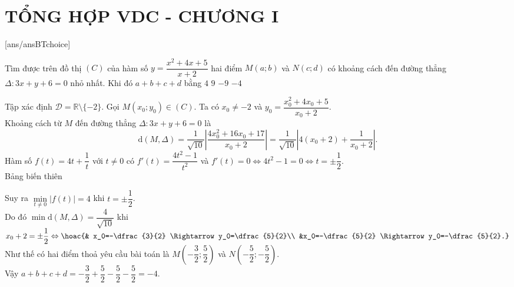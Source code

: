 \setcounter{ex}{0}
\section*{TỔNG HỢP VDC - CHƯƠNG I}
[ans/ansBTchoice]
\TN
\begin{ex}%
Tìm được trên đồ thị $(C)$ của hàm số $y=\dfrac{x^2+4x+5}{x+2}$ hai điểm $M(a;b)$ và $N(c;d)$ có khoảng cách đến đường thẳng $\Delta\colon 3x+y+6=0$ nhỏ nhất. Khi đó $a+b+c+d$ bằng
\choice
{$4$}
{$9$}
{$-9$}
{\True $-4$}
\loigiai
{Tập xác định $\mathscr{D}=\mathbb{R}\setminus\{-2\}$.
Gọi $M\left(x_0;y_0\right) \in (C)$. Ta có $x_0\neq -2$ và $y_0=\dfrac{x_0^2+4x_0+5}{x_0+2}$.\\
Khoảng cách từ $M$ đến đường thẳng $\Delta\colon 3x+y+6=0$ là
$$\mathrm{d}\left(M,\Delta\right)=\dfrac{1}{\sqrt{10}}\left|\dfrac{4x_0^2+16x_0+17}{x_0+2}\right|=\dfrac{1}{\sqrt{10}}\left|4\left(x_0+2\right)+\dfrac{1}{x_0+2}\right|.$$
Hàm số $f(t)=4t+\dfrac{1}{t}$ với $t\neq 0$ có $f'(t)=\dfrac{4t^2-1}{t^2}$ và $f'(t)=0\Leftrightarrow 4t^2-1=0\Leftrightarrow t=\pm \dfrac{1}{2}$.\\
Bảng biến thiên \begin{center}
\end{center}
Suy ra $\min\limits_{t\neq 0} \left|f(t)\right|=4$ khi $t=\pm\dfrac{1}{2}$.\\
Do đó $\min\mathrm{d}(M,\Delta)=\dfrac{4}{\sqrt{10}}$ khi
$x_0+2=\pm\dfrac{1}{2} \Leftrightarrow \hoac{& x_0=-\dfrac{3}{2} \Rightarrow y_0=\dfrac{5}{2}\\ &x_0=-\dfrac{5}{2} \Rightarrow y_0=-\dfrac{5}{2}.}$\\
Như thế có hai điểm thoả yêu cầu bài toán là $M\left(-\dfrac{3}{2};\dfrac{5}{2}\right)$ và $N\left(-\dfrac{5}{2};-\dfrac{5}{2}\right)$.\\
Vậy $a+b+c+d=-\dfrac{3}{2}+\dfrac{5}{2}-\dfrac{5}{2}-\dfrac{5}{2}=-4$.
}
\end{ex}

